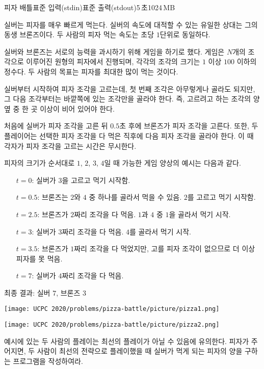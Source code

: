 \begin{problem}{피자 배틀}{표준 입력(stdin)}{표준 출력(stdout)}{5\,초}{1024\,MB}

실버는 피자를 매우 빠르게 먹는다. 실버의 속도에 대적할 수 있는 유일한 상대는 그의 동생 브론즈이다. 두 사람의 피자 먹는 속도는 초당 $1$단위로 동일하다.

실버와 브론즈는 서로의 능력을 과시하기 위해 게임을 하기로 했다. 게임은 $N$개의 조각으로 이루어진 원형의 피자에서 진행되며, 각각의 조각의 크기는 $1$ 이상 $100$ 이하의 정수다. 두 사람의 목표는 피자를 최대한 많이 먹는 것이다.

실버부터 시작하여 피자 조각을 고르는데, 첫 번째 조각은 아무렇게나 골라도 되지만, 그 다음 조각부터는 바깥쪽에 있는 조각만을 골라야 한다. 즉, 고르려고 하는 조각의 양 옆 중 한 곳 이상이 비어 있어야 한다.

처음에 실버가 피자 조각을 고른 뒤 $0.5$초 후에 브론즈가 피자 조각을 고른다. 또한, 두 플레이어는 선택한 피자 조각을 다 먹은 직후에 다음 피자 조각을 골라야 한다. 이 때 각자가 피자 조각을 고르는 시간은 무시한다.

피자의 크기가 순서대로 $1$, $2$, $3$, $4$일 때 가능한 게임 양상의 예시는 다음과 같다.
\begin{itemize}
    \item[$t=0$:] 실버가 $3$을 고르고 먹기 시작함.
    \item[$t=0.5$:] 브론즈는 $2$와 $4$ 중 하나를 골라서 먹을 수 있음. $2$를 고르고 먹기 시작함.
    \item[$t=2.5$:] 브론즈가 $2$짜리 조각을 다 먹음. $1$과 $4$ 중 $1$을 골라서 먹기 시작.
    \item[$t=3$:] 실버가 $3$짜리 조각을 다 먹음. $4$를 골라서 먹기 시작.
    \item[$t=3.5$:] 브론즈가 $1$짜리 조각을 다 먹었지만, 고를 피자 조각이 없으므로 더 이상 피자를 못 먹음.
    \item[$t=7$:] 실버가 $4$짜리 조각을 다 먹음.
\end{itemize}

최종 결과: 실버 $7$, 브론즈 $3$

\texttt{[image: UCPC 2020/problems/pizza-battle/picture/pizza1.png]}
\begin{center}
    \texttt{[image: UCPC 2020/problems/pizza-battle/picture/pizza2.png]}
\end{center}

예시에 있는 두 사람의 플레이는 최선의 플레이가 아닐 수 있음에 유의한다. 피자가 주어지면, 두 사람이 최선의 전략으로 플레이했을 때 실버가 먹게 되는 피자의 양을 구하는 프로그램을 작성하여라.


\end{problem}
